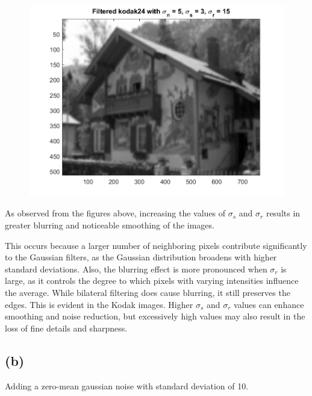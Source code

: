 \documentclass{article}
\begin{document}
\begin{figure}[!htb]
\begin{minipage}[b]{0.3\textwidth}
        \includegraphics[width=\textwidth]{kodak24_5_3_15_10.png}
    \end{minipage}
\end{figure}

\newpage
As observed from the figures above, increasing the values of $\sigma_s$ and $\sigma_r$ results in greater blurring and noticeable smoothing of the images. 

This occurs because a larger number of neighboring pixels contribute significantly to the Gaussian filters, as the Gaussian distribution broadens with higher standard deviations. Also, the blurring effect is more pronounced when $\sigma_r$ is large, as it controls the degree to which pixels with varying intensities influence the average. While bilateral filtering does cause blurring, it still preserves the edges. This is evident in the Kodak images. Higher $\sigma_s$ and $\sigma_r$ values can enhance smoothing and noise reduction, but excessively high values may also result in the loss of fine details and sharpness.

\newpage
\subsection*{(b)}

Adding a zero-mean gaussian noise with standard deviation of 10.
\end{document}
